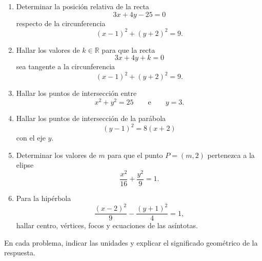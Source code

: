 \documentclass[11pt]{article}
\newcommand{\R}{\mathbb{R}}
\def\identacion{-2.5mm}%
\begin{document}
\begin{enumerate}[\hspace*{\identacion}1)]
\item Determinar la posición relativa de la recta
\[
3x+4y-25=0
\]
respecto de la circunferencia
\[
(x-1)^2+(y+2)^2=9.
\]

\item Hallar los valores de $k\in\R$ para que la recta
\[
3x+4y+k=0
\]
sea tangente a la circunferencia
\[
(x-1)^2+(y+2)^2=9.
\]

\item Hallar los puntos de intersección entre
\[
x^2+y^2=25
\qquad\text{e}\qquad
y=3.
\]

\item Hallar los puntos de intersección de la parábola
\[
(y-1)^2=8(x+2)
\]
con el eje $y$.

\item Determinar los valores de $m$ para que el punto $P=(m,2)$ pertenezca a la elipse
\[
\frac{x^2}{16}+\frac{y^2}{9}=1.
\]

\item Para la hipérbola
\[
\frac{(x-2)^2}{9}-\frac{(y+1)^2}{4}=1,
\]
hallar centro, vértices, focos y ecuaciones de las asíntotas.
\end{enumerate}

\bigskip

\begin{mdframed}[style=EjerSty,frametitle={Actividad 4: situaciones de aplicación}]
En cada problema, indicar las unidades y explicar el significado geométrico de la respuesta.
\end{mdframed}
\end{document}
